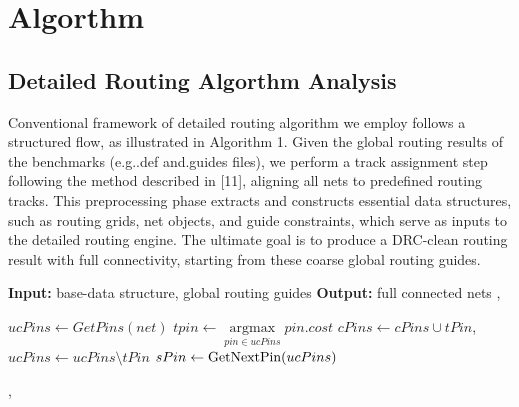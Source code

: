 \section{Algorthm}
\subsection{Detailed Routing Algorthm Analysis}

Conventional framework of detailed routing algorithm we employ follows a structured flow, as illustrated in Algorithm 1. 
Given the global routing results of the benchmarks (e.g..def and.guides files), we perform a track assignment step following the method described in [11], aligning all nets to predefined routing tracks. 
This preprocessing phase extracts and constructs essential data structures, such as routing grids, net objects, and guide constraints, which serve as inputs to the detailed routing engine. 
The ultimate goal is to produce a DRC-clean routing result with full connectivity, starting from these coarse global routing guides.


\begin{algorithm}[hpt]
\caption{Detailed Routing Flow}
\label{alg:detail_routing_algorithm}
\begin{algorithmic}[1]
\Statex \textbf{Input:} base-data structure, global routing guides
\Statex \textbf{Output:} full connected nets
\STATE {}, 

    \STATE {}
        \STATE $\text{$ucPins$} \gets \text{$GetPins(net)$}$
            \STATE $\text{$tpin$} \gets \mathop{\arg\max}\limits_{pin \in ucPins} \text{$pin.cost$}$
            \STATE $\text{$cPins$} \gets \text{$cPins$} \cup \text{$tPin$}$, $\text{$ucPins$} \gets \text{$ucPins$} \setminus \text{$tPin$}$
            \STATE $\text{$sPin$} \gets \text{GetNextPin(\text{$ucPins$})}$
            \STATE {}
        \ENDWHILE
    \ENDWHILE
    
    \STATE {}, 
\ENDWHILE
\STATE {}
\end{algorithmic}
\end{algorithm}


